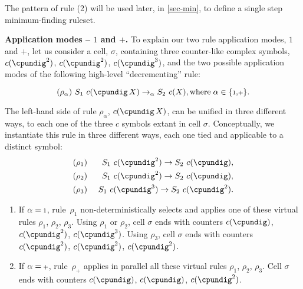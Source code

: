 The pattern of rule (2) will be used later, in \cref{sec-min}, 
to define a single step minimum-finding ruleset.

\smallskip
\noindent
\textbf{Application modes -- $1$ and $+$.}
To explain our two rule application modes, $1$ and $+$,
let us consider a cell, $\sigma$, containing three counter-like complex symbols,
$c(\cpundig^2)$, $c(\cpundig^2)$, $c(\cpundig^3)$,
and the two possible application modes of the following high-level ``decrementing'' rule:
\vspace{-0.2cm}
\begin{framed}
\vspace{-0.5cm}
$$(\rho_\alpha) ~S_1 ~c(\cpundig \, X) \rightarrow_{\alpha} S_2 ~c(X),\\
\mathrm{where} \; \alpha \in \{\scriptstyle 1 \displaystyle, \scriptstyle + \displaystyle\}.$$
\vspace{-0.8cm}
\end{framed}

The left-hand side of rule $\rho_\alpha$, $c(\cpundig \, X)$, can be unified in three different ways,
to each one of the three $c$ symbols extant in cell $\sigma$.
Conceptually, we instantiate this rule in three different ways,
each one tied and applicable to a distinct symbol:
\begin{eqnarray*}
& (\rho_1)  & ~S_1 ~c(\cpundig^2) \rightarrow S_2 ~c(\cpundig),\\
& (\rho_2)  & ~S_1 ~c(\cpundig^2) \rightarrow S_2 ~c(\cpundig),\\
& (\rho_3) & ~S_1 ~c(\cpundig^3) \rightarrow S_2 ~c(\cpundig^2).
\end{eqnarray*}

\begin{enumerate}
\item If $\alpha = \: \scriptstyle 1 \displaystyle$, rule~$\rho_1$ 
non-deterministically selects and applies one of these virtual rules $\rho_1$, $\rho_2$, $\rho_3$.
Using $\rho_1$ or $\rho_2$, 
cell $\sigma$ ends with counters $c(\cpundig)$, $c(\cpundig^2)$, $c(\cpundig^3)$.
Using $\rho_3$,
cell $\sigma$ ends with counters $c(\cpundig^2)$, $c(\cpundig^2)$, $c(\cpundig^2)$.

\smallskip
\item If $\alpha = \: \scriptstyle + \displaystyle$, rule~$\rho_+$ 
applies in parallel all these virtual rules $\rho_1$, $\rho_2$, $\rho_3$.
Cell $\sigma$ ends with counters $c(\cpundig)$, $c(\cpundig)$, $c(\cpundig^2)$.
\end{enumerate}


